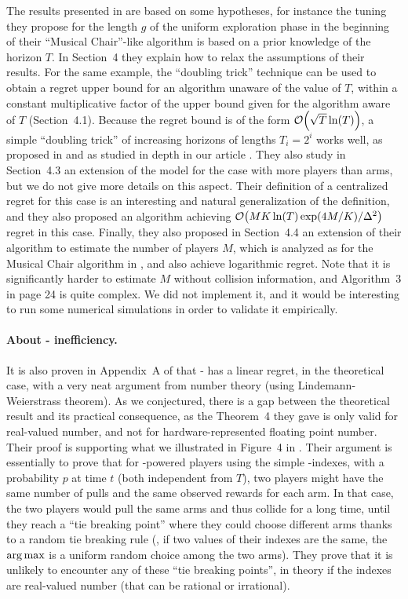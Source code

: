 The results presented in \cite{LugosiMehrabian18} are based on some hypotheses, for instance the tuning they propose for the length $g$ of the uniform exploration phase in the beginning of their ``Musical Chair''-like algorithm is based on a prior knowledge of the horizon $T$.
In Section~4 they explain how to relax the assumptions of their results.
For the same example, the ``doubling trick'' technique can be used to obtain a regret upper bound for an algorithm unaware of the value of $T$, within a constant multiplicative factor of the upper bound given for the algorithm aware of $T$ (Section~4.1). Because the regret bound is of the form $\mathop{}\mathopen{}\mathcal{O}\mathopen{}\left(\sqrt{T} \ln(T)\right)$, a simple ``doubling trick'' of increasing horizons of lengths $T_i = 2^i$ works well, as proposed in \cite{CesaLugosi06} and as studied in depth in our article \cite{Besson2018DoublingTricks}.
%
They also study in Section~4.3 an extension of the model for the case with more players than arms, but we do not give more details on this aspect. Their definition of a centralized regret for this case is an interesting and natural generalization of the definition, and they also proposed an algorithm achieving $\mathop{}\mathopen{}\mathcal{O}\mathopen{}\left(M K \ln(T) \exp(4M/K) / \Delta^2\right)$ regret in this case.
Finally, they also proposed in Section~4.4 an extension of their algorithm to estimate the number of players $M$, which is analyzed as for the Musical Chair algorithm in \cite{Rosenski16}, and also achieve logarithmic regret.
Note that it is significantly harder to estimate $M$ without collision information, and Algorithm~3 in page 24 is quite complex.
We did not implement it, and it would be interesting to run some numerical simulations in order to validate it empirically.


\paragraph{About \Selfish-\UCB{} inefficiency.}
%
It is also proven in Appendix~A of \cite{BoursierPerchet18} that \Selfish-\UCB{} has a linear regret, in the theoretical case, with a very neat argument from number theory (using Lindemann-Weierstrass theorem). As we conjectured, there is a gap between the theoretical result and its practical consequence, as the Theorem~4 they gave is only valid for real-valued number, and not for hardware-represented floating point number.
Their proof is supporting what we illustrated in Figure~4 in \cite{Besson2018ALT}.
Their argument is essentially to prove that for \Selfish-powered players using the simple \UCB-indexes, with a probability $p$ at time $t$ (both independent from $T$), two players might have the same number of pulls and the same observed rewards for each arm. In that case, the two players would pull the same arms and thus collide for a long time, until they reach a ``tie breaking point'' where they could choose different arms thanks to a random tie breaking rule (\eg, if two values of their \UCB{} indexes are the same, the $\operatorname*{arg\,max}$ is a uniform random choice among the two arms).
They prove that it is unlikely to encounter any of these ``tie breaking points'', in theory if the \UCB{} indexes are real-valued number (that can be rational or irrational).


